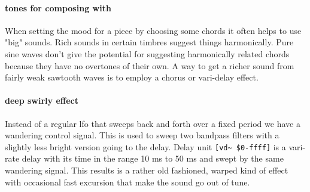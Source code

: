 \paragraph{tones for composing with}
When setting the mood for a piece by choosing some
chords it often helps to use "big" sounds.
Rich sounds in certain timbres suggest things
harmonically. Pure sine waves don't give the potential
for suggesting harmonically related chords because they
have no overtones of their own. A way to get a richer sound
from fairly weak sawtooth waves is to employ a chorus or
vari-delay effect. 

\paragraph{deep swirly effect}
Instead of a regular lfo that sweeps back and forth over
a fixed period we have a wandering control signal. This 
is used to sweep two bandpass filters with a slightly less
bright version going to the delay. Delay unit \verb+[vd~ $0-ffff]+
is a vari-rate delay with its time in the range 10 ms to 50 ms and
swept by the same wandering signal. This results is a rather
old fashioned, warped kind of effect with occasional fast
excursion that make the sound go out of tune.